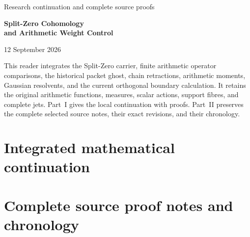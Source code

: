 \documentclass[11pt,a4paper]{article}
\theoremstyle{definition}
\theoremstyle{remark}
\begin{document}
\begin{titlepage}
\centering
\vspace*{25mm}
{\Large Research continuation and complete source proofs\par}
\vspace{12mm}
{\Huge\bfseries Split-Zero Cohomology\\[5mm]and Arithmetic Weight Control\par}
\vspace{15mm}
{\Large 12 September 2026\par}
\vfill
\begin{minipage}{0.87\textwidth}
This reader integrates the Split-Zero carrier, finite arithmetic operator
comparisons, the historical packet ghost, chain retractions, arithmetic
moments, Gaussian resolvents, and the current orthogonal boundary calculation.
It retains the original arithmetic
functions, measures, scalar actions, support fibres, and complete jets.
Part~I gives the local continuation with proofs. Part~II preserves the
complete selected source notes, their exact revisions, and their chronology.
\end{minipage}
\vspace{22mm}
\end{titlepage}
\tableofcontents
\clearpage
\part{Integrated mathematical continuation}












\clearpage
\part{Complete source proof notes and chronology}
\appendix
\sloppy

\end{document}
